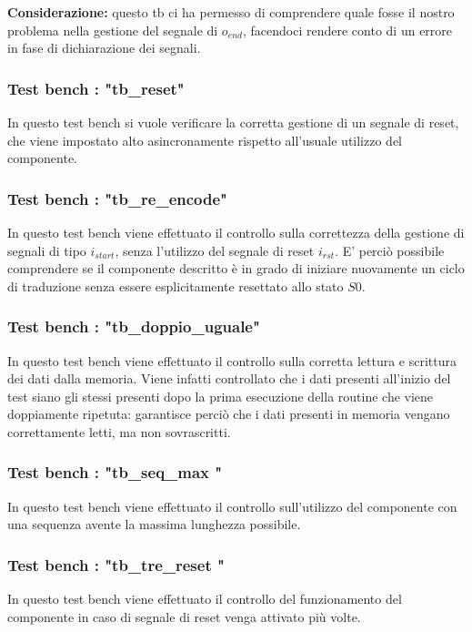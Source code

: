 \documentclass[12pt]{article} %
\begin{document}
				\textbf{Considerazione:} questo tb ci ha permesso di comprendere quale fosse il nostro problema 
				nella gestione del segnale di $o_{end}$, facendoci rendere conto di un errore  in fase di
				dichiarazione dei segnali.
			\subsubsection{Test bench : "tb\_reset"}	
				In questo test bench si vuole verificare la corretta gestione di un segnale di reset,
				che viene impostato alto asincronamente rispetto all’usuale utilizzo del componente.
				
			\subsubsection{Test bench :  "tb\_re\_encode"}
				In questo test bench viene effettuato il controllo sulla correttezza della gestione 
				di segnali di tipo $i_{start}$, senza l’utilizzo del segnale di reset $i_{rst}$. 
				E’ perciò possibile comprendere se il componente descritto è in grado 
				di iniziare nuovamente un ciclo di traduzione senza essere esplicitamente 
				resettato allo stato $S0$.
			
			\subsubsection{Test bench : "tb\_doppio\_uguale"}
				In questo test bench viene effettuato il controllo sulla corretta lettura e scrittura 
				dei dati dalla memoria. Viene infatti controllato che i dati presenti all’inizio del test 
				siano gli stessi presenti dopo la prima esecuzione della routine che viene 
				doppiamente ripetuta: garantisce perciò che i dati presenti in memoria 
				vengano correttamente letti, ma non sovrascritti.
				
			\subsubsection{Test bench : "tb\_seq\_max "}
				In questo test bench viene effettuato il controllo sull’utilizzo del componente 
				con una sequenza avente la massima lunghezza possibile.
				
			\subsubsection{Test bench : "tb\_tre\_reset "}
				In questo test bench viene effettuato il controllo del funzionamento del 
				componente in caso di segnale di reset venga attivato più volte.
				
\end{document}

